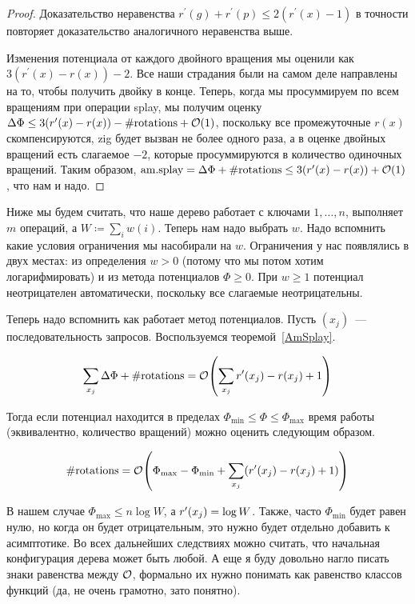 \begin{proof}
	Доказательство неравенства $r^\prime(g) + r^\prime(p) \leq 2(r^\prime(x) - 1)$ в точности повторяет доказательство аналогичного неравенства выше.

	Изменения потенциала от каждого двойного вращения мы оценили как $3(r^\prime(x) - r(x)) - 2$. Все наши страдания были на самом деле направлены на то, чтобы получить двойку в конце. Теперь, когда мы просуммируем по всем вращениям при операции splay, мы получим оценку $\Delta\Phi \leq 3(r^\prime(x) - r(x)) - \#\text{rotations} + \mathcal{O}(1)$, поскольку все промежуточные $r(x)$ скомпенсируются, zig будет вызван не более одного раза, а в оценке двойных вращений есть слагаемое $-2$, которые просуммируются в количество одиночных вращений. Таким образом, $\text{am.splay} = \Delta\Phi + \#\text{rotations} \leq 3(r^\prime(x) - r(x)) + \mathcal{O}(1)$, что нам и надо.
\end{proof}

Ниже мы будем считать, что наше дерево работает с ключами $1, \ldots, n$, выполняет $m$ операций, а $W \coloneqq \sum_i w(i)$. Теперь нам надо выбрать $w$. Надо вспомнить какие условия ограничения мы насобирали на $w$. Ограничения у нас появлялись в двух местах: из определения $w > 0$ (потому что мы потом хотим логарифмировать) и из метода потенциалов $\Phi \geq 0$. При $w \geq 1$ потенциал неотрицателен автоматически, поскольку все слагаемые неотрицательны.

Теперь надо вспомнить как работает метод потенциалов. Пусть $(x_j)$~--- последовательность запросов. Воспользуемся теоремой~\ref{AmSplay}.

\begin{equation*}
	\sum_{x_j} \Delta\Phi + \#\text{rotations} = \BigO \parens*{\sum_{x_j} r^\prime(x_j) - r(x_j) + 1}	
\end{equation*}

Тогда если потенциал находится в пределах $\Phi_{\min} \leq \Phi \leq \Phi_{\max}$ время работы (эквивалентно, количество вращений) можно оценить следующим образом.

\begin{equation}\label{PotentialMethod}
	\#\text{rotations} = \BigO \parens*{\Phi_{\max} - \Phi_{\min} + \sum_{x_j} \parens*{r^\prime \parens*{x_j} - r \parens*{x_j} + 1}}
\end{equation}

В нашем случае $\Phi_{\max} \leq n \log W$, а $r^\prime \parens*{x_j} = \log W$. Также, часто $\Phi_{\min}$ будет равен нулю, но когда он будет отрицательным, это нужно будет отдельно добавить к асимптотике. Во всех дальнейших следствиях можно считать, что начальная конфигурация дерева может быть любой. А еще я буду довольно нагло писать знаки равенства между $\mathcal{O}$, формально их нужно понимать как равенство классов функций (да, не очень грамотно, зато понятно).

